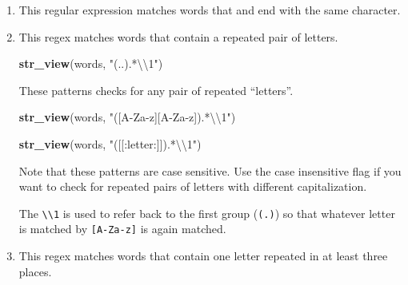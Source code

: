 \documentclass[]{book}
\newenvironment{Shaded}{\begin{snugshade}}{\end{snugshade}}
\newcommand{\CharTok}[1]{\textcolor[rgb]{0.31,0.60,0.02}{#1}}
\newcommand{\DataTypeTok}[1]{\textcolor[rgb]{0.13,0.29,0.53}{#1}}
\newcommand{\KeywordTok}[1]{\textcolor[rgb]{0.13,0.29,0.53}{\textbf{#1}}}
\newcommand{\NormalTok}[1]{#1}
\newcommand{\OperatorTok}[1]{\textcolor[rgb]{0.81,0.36,0.00}{\textbf{#1}}}
\newcommand{\OtherTok}[1]{\textcolor[rgb]{0.56,0.35,0.01}{#1}}
\newcommand{\StringTok}[1]{\textcolor[rgb]{0.31,0.60,0.02}{#1}}
\theoremstyle{plain}
\theoremstyle{remark}
\begin{document}
\begin{enumerate}
\def\labelenumi{\arabic{enumi}.}
\item
  This regular expression matches words that and end with the same
  character.

\begin{Shaded}
\end{Shaded}
\item
  This regex matches words that contain a repeated pair of letters.

\begin{Shaded}
\begin{Highlighting}[]
\KeywordTok{str_view}\NormalTok{(words, }\StringTok{"(..).*}\CharTok{\textbackslash{}\textbackslash{}}\StringTok{1"}\NormalTok{)}
\end{Highlighting}
\end{Shaded}

  These patterns checks for any pair of repeated ``letters''.

\begin{Shaded}
\begin{Highlighting}[]
\KeywordTok{str_view}\NormalTok{(words, }\StringTok{"([A-Za-z][A-Za-z]).*}\CharTok{\textbackslash{}\textbackslash{}}\StringTok{1"}\NormalTok{)}
\end{Highlighting}
\end{Shaded}

\begin{Shaded}
\begin{Highlighting}[]
\KeywordTok{str_view}\NormalTok{(words, }\StringTok{"([[:letter:]]).*}\CharTok{\textbackslash{}\textbackslash{}}\StringTok{1"}\NormalTok{)}
\end{Highlighting}
\end{Shaded}

  Note that these patterns are case sensitive. Use the case insensitive
  flag if you want to check for repeated pairs of letters with different
  capitalization.

  The \texttt{\textbackslash{}\textbackslash{}1} is used to refer back
  to the first group (\texttt{(.)}) so that whatever letter is matched
  by \texttt{{[}A-Za-z{]}} is again matched.
\item
  This regex matches words that contain one letter repeated in at least
  three places.


\end{enumerate}
\end{document}
